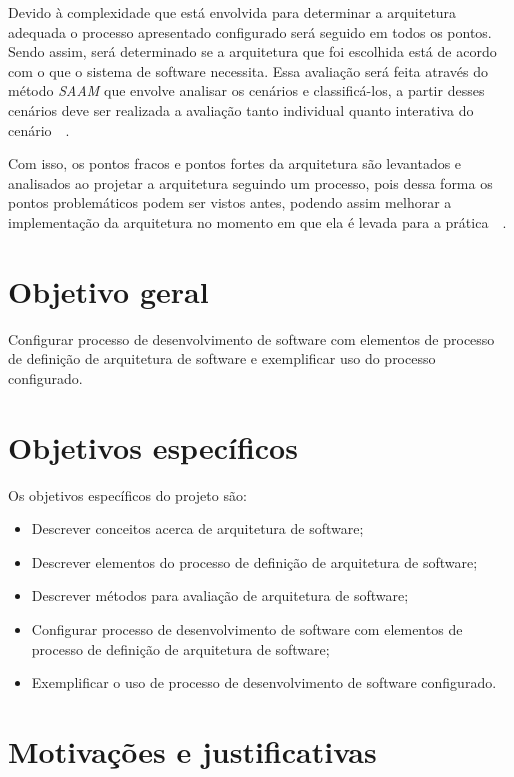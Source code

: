 Devido à complexidade que está envolvida para determinar a arquitetura adequada o processo apresentado configurado será seguido em todos os pontos. Sendo assim, será determinado se a arquitetura que foi escolhida está de acordo com o que o sistema de software necessita. Essa avaliação será feita através do método \emph{\acrfull{SAAM}} que envolve analisar os cenários e classificá-los, a partir desses cenários deve ser realizada a avaliação tanto individual quanto interativa do cenário~\cite{survey_methods}~\cite{scenario_methods}.

Com isso, os pontos fracos e pontos fortes da arquitetura são levantados e analisados ao projetar a arquitetura seguindo um processo, pois dessa forma os pontos problemáticos podem ser vistos antes, podendo assim melhorar a implementação da arquitetura no momento em que ela é levada para a prática~\cite{survey_methods}~\cite{scenario_methods}.


\section{Objetivo geral}

Configurar processo de desenvolvimento de software com elementos de processo de definição de arquitetura de software e exemplificar uso do processo configurado.

\section{Objetivos específicos}

Os objetivos específicos do projeto são:
\begin{itemize}
    \item Descrever  conceitos acerca de arquitetura de software;
    \item Descrever elementos do processo de definição de arquitetura de software;
    \item Descrever métodos para avaliação de arquitetura de software;
    \item Configurar processo de desenvolvimento de software com elementos de processo de definição de arquitetura de software;
    \item Exemplificar o uso de processo de desenvolvimento de software configurado.
\end{itemize}

\section{Motivações e justificativas}

